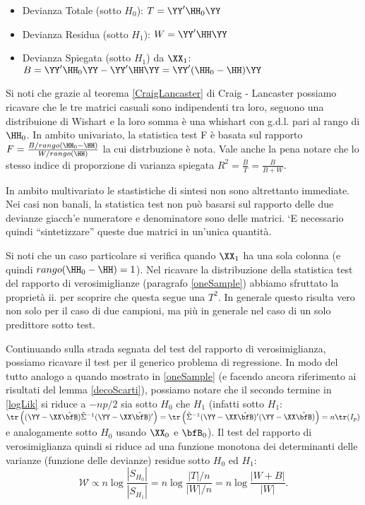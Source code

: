 \documentclass[]{article}
\begin{document}
\begin{itemize}
\item Devianza Totale (sotto $H_0$): $T=\YY'\HH_0\YY$
\item Devianza Residua (sotto $H_1$):  $W=\YY'\HH\YY$
\item Devianza Spiegata (sotto $H_1$) da $\XX_1$: $B=\YY'\HH_0\YY-\YY'\HH\YY=\YY'(\HH_0-\HH)\YY$
\end{itemize}

Si noti che grazie al teorema \ref{CraigLancaster} di Craig - Lancaster
possiamo ricavare che le tre matrici casuali sono indipendenti tra loro,
seguono una distribuione di Wishart e la loro somma è una whishart con
g.d.l. pari al rango di \(\HH_0\). In ambito univariato, la statistica
test F è basata sul rapporto
\(F=\frac{B/rango(\HH_0-\HH)}{W/rango(\HH)}\) la cui distrbuzione è
nota. Vale anche la pena notare che lo stesso indice di proporzione di
varianza spiegata \(R^2=\frac{B}{T}=\frac{B}{B+W}\).

In ambito multivariato le stastistiche di sintesi non sono altrettanto
immediate. Nei casi non banali, la statistica test non può basarsi sul
rapporto delle due devianze giacch'e numeratore e denominatore sono
delle matrici. `E necessario quindi ``sintetizzare'' queste due matrici
in un'unica quantità.

Si noti che un caso particolare si verifica quando \(\XX_1\) ha una sola
colonna (e quindi \(rango(\HH_0-\HH)=1\)). Nel ricavare la distribuzione
della statistica test del rapporto di verosimiglianze (paragrafo
\ref{oneSample}) abbiamo sfruttato la proprietà ii. per scoprire che
questa segue una \(T^2\). In generale questo risulta vero non solo per
il caso di due campioni, ma più in generale nel caso di un solo
predittore sotto test.

Continuando sulla strada segnata del test del rapporto di
verosimiglianza, possiamo ricavare il test per il generico problema di
regressione. In modo del tutto analogo a quando mostrato in
\ref{oneSample} (e facendo ancora riferimento ai risultati del lemma
\ref{decoScarti}), possiamo notare che il secondo termine in
\ref{logLik} si riduce a \(-np/2\) sia sotto \(H_0\) che \(H_1\)
(infatti sotto \(H_1\):
\(\tr\left( (\YY-\XX\hat{\bfB})\hat{\Sigma}^{-1}(\YY-\XX\hat{\bfB})' \right)= \tr\left( \hat{\Sigma}^{-1}(\YY-\XX\hat{\bfB})'(\YY-\XX\hat{\bfB}) \right)=n\tr(I_p)\)
e analogamente sotto \(H_0\) usando \(\XX_0\) e \(\bfB_0\)). Il test del
rapporto di verosimiglianza quindi si riduce ad una funzione monotona
dei determinanti delle varianze (funzione delle devianze) residue sotto
\(H_0\) ed \(H_1\):
\[\mathcal{W}\propto n\log\frac{|S_{H_0}|}{|S_{H_1}|}=n\log\frac{|T|/n}{|W|/n}=n\log\frac{|W+B|}{|W|}.\]
\end{document}

